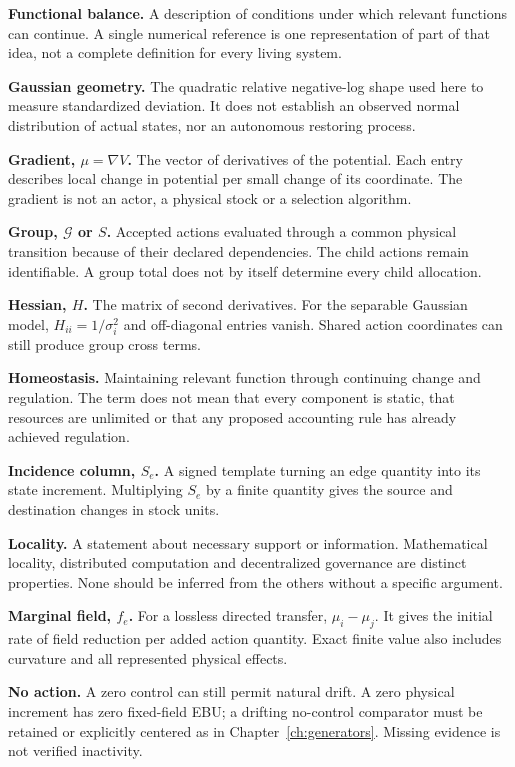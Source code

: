 \textbf{Functional balance.} A description of conditions under which relevant functions can continue. A single numerical reference is one representation of part of that idea, not a complete definition for every living system.

\textbf{Gaussian geometry.} The quadratic relative negative-log shape used here to measure standardized deviation. It does not establish an observed normal distribution of actual states, nor an autonomous restoring process.

\textbf{Gradient, $\mu=\nabla V$.} The vector of derivatives of the potential. Each entry describes local change in potential per small change of its coordinate. The gradient is not an actor, a physical stock or a selection algorithm.

\textbf{Group, $\mathcal G$ or $S$.} Accepted actions evaluated through a common physical transition because of their declared dependencies. The child actions remain identifiable. A group total does not by itself determine every child allocation.

\textbf{Hessian, $H$.} The matrix of second derivatives. For the separable Gaussian model, $H_{ii}=1/\sigma_i^2$ and off-diagonal entries vanish. Shared action coordinates can still produce group cross terms.

\textbf{Homeostasis.} Maintaining relevant function through continuing change and regulation. The term does not mean that every component is static, that resources are unlimited or that any proposed accounting rule has already achieved regulation.

\textbf{Incidence column, $S_e$.} A signed template turning an edge quantity into its state increment. Multiplying $S_e$ by a finite quantity gives the source and destination changes in stock units.

\textbf{Locality.} A statement about necessary support or information. Mathematical locality, distributed computation and decentralized governance are distinct properties. None should be inferred from the others without a specific argument.

\textbf{Marginal field, $f_e$.} For a lossless directed transfer, $\mu_i-\mu_j$. It gives the initial rate of field reduction per added action quantity. Exact finite value also includes curvature and all represented physical effects.

\textbf{No action.} A zero control can still permit natural drift. A zero physical increment has zero fixed-field EBU; a drifting no-control comparator must be retained or explicitly centered as in Chapter~\ref{ch:generators}. Missing evidence is not verified inactivity.

